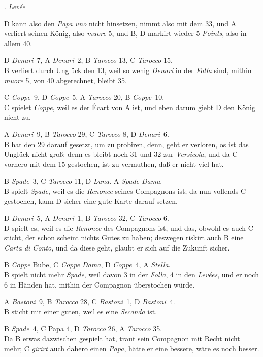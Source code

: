 \documentclass[11pt,a6paper,twoside]{article}
\newcounter{leveescnt}
\newenvironment{leveeslist}{
  \begin{list}
    {\arabic{leveescnt}. {\textit{Levée}}}
    {\usecounter{leveescnt}
      \setlength{\labelwidth}{2em}
      \setlength{\labelsep}{1em}
      \setlength{\itemsep}{0pt}
      \setlength{\parsep}{0pt}
      \setlength{\leftmargin}{1.5em}
      \setlength{\itemindent}{1em} %
    }
}{\end{list}}
\begin{document}
\begin{leveeslist}
  D kann also den \textit{Papa uno} nicht hinsetzen, nimmt also mit dem 33, und A verliert seinen König, also \textit{muore} 5, und B, D markirt wieder 5 \textit{Points}, also in allem 40.
\item D \textit{Denari}~7, A \textit{Denari}~2, B \textit{Tarocco} 13, C \textit{Tarocco} 15. \\B verliert durch Unglück den 13, weil so wenig \textit{Denari} in der \textit{Folla} sind, mithin \textit{muore} 5, von 40 abgerechnet, bleibt 35.
\item C \textit{Coppe}~9, D \textit{Coppe}~5, A \textit{Tarocco} 20, B \textit{Coppe}~10. \\C spielet \textit{Coppe}, weil es der Écart von A ist, und eben darum giebt D den König nicht zu.
\item A \textit{Denari}~9, B \textit{Tarocco} 29, C \textit{Tarocco} 8, D \textit{Denari}~6.\\ B hat den 29 darauf gesetzt, um zu probiren, denn, geht er verloren, os ist das Unglück nicht groß; denn es bleibt noch 31 und 32 zur \textit{Versicola}, und da C vorhero mit dem 15 gestochen, ist zu vermuthen, daß er nicht viel hat.
\item B \textit{Spade}~3, C \textit{Tarocco} 11, D \textit{Luna}. A \textit{Spade Dama}. \\B spielt \textit{Spade}, weil es die \textit{Renonce} seines Compagnons ist; da nun vollends C gestochen, kann D sicher eine gute Karte darauf setzen.
\item D \textit{Denari}~5, A \textit{Denari}~1, B \textit{Tarocco} 32, C \textit{Tarocco} 6. \\D spielt es, weil es die \textit{Renonce} des Compagnons ist, und das, obwohl es auch C sticht, der schon scheint nichts Gutes zu haben; deswegen riskirt auch B eine \textit{Carta di Conto}, und da diese geht, glaubt er sich auf die Zukunft sicher.
\item B \textit{Coppe} Bube, C \textit{Coppe Dama}, D \textit{Coppe}~4, A \textit{Stella}.\\ B spielt nicht mehr \textit{Spade}, weil davon 3 in der \textit{Folla}, 4 in den \textit{Levées}, und er noch 6 in Händen hat, mithin der Compagnon überstochen würde.
\item A \textit{Bastoni}~9, B \textit{Tarocco} 28, C \textit{Bastoni}~1, D \textit{Bastoni}~4.\\ B sticht mit einer guten, weil es eine \textit{Seconda} ist.
\item B \textit{Spade}~4, C Papa 4, D \textit{Tarocco} 26, A \textit{Tarocco} 35. \\Da B etwas dazwischen gespielt hat, traut sein Compagnon mit Recht nicht mehr; C \textit{girirt} auch dahero einen \textit{Papa}, hätte er eine bessere, wäre es noch besser.

\end{leveeslist}
\end{document}
